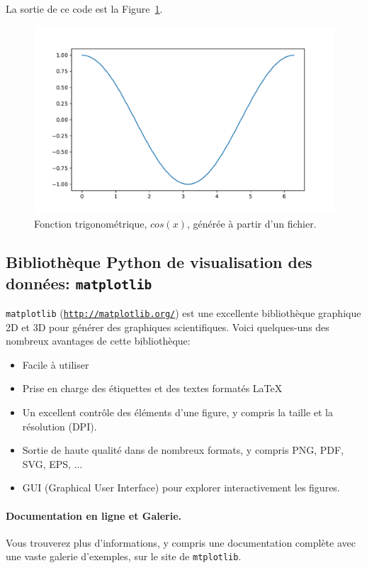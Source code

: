 \documentclass[%
oneside,                 %
final,                   %
10pt,french]{article}
\begin{document}
La sortie de ce code est la Figure~\ref{figout:trig4}.

\begin{figure}[!ht]  %
  \centerline{\includegraphics[width=0.7\linewidth]{imgs/fonct_trig4.pdf}}
  \caption{
  Fonction trigonométrique, $cos(x)$, générée à partir d'un fichier. \label{figout:trig4}
  }
\end{figure}


\subsection{Bibliothèque Python de visualisation des données: \texttt{matplotlib} }
\texttt{matplotlib} (\href{{http://matplotlib.org/}}{\nolinkurl{http://matplotlib.org/}}) est une excellente bibliothèque graphique 2D et 3D pour générer des graphiques scientifiques. Voici quelques-uns des nombreux avantages de cette bibliothèque:

\begin{itemize}
\item Facile à utiliser

\item Prise en charge des étiquettes et des textes formatés {\LaTeX}

\item Un excellent contrôle des éléments d'une figure, y compris la taille et la résolution (DPI).

\item Sortie de haute qualité dans de nombreux formats, y compris PNG, PDF, SVG, EPS, ...

\item GUI (Graphical User Interface) pour explorer interactivement les figures.
\end{itemize}

\noindent
\paragraph{Documentation en ligne et Galerie.}
Vous trouverez plus d'informations, y compris une documentation complète avec une vaste galerie d'exemples, sur le site de \texttt{mtplotlib}.
\end{document}
